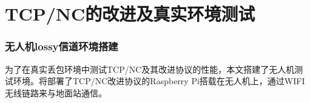 \chapter{TCP/NC的改进及真实环境测试}
\subsection{无人机lossy信道环境搭建}
为了在真实丢包环境中测试TCP/NC及其改进协议的性能，本文搭建了无人机测试环境。将部署了TCP/NC改进协议的Raspberry Pi搭载在无人机上，通过WIFI无线链路来与地面站通信。 